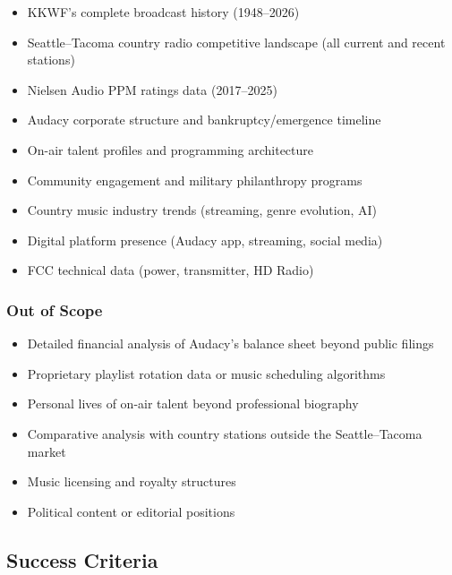 \documentclass[11pt,letterpaper]{article}
\begin{document}
\begin{itemize}[leftmargin=2em]
\item KKWF's complete broadcast history (1948--2026)
\item Seattle--Tacoma country radio competitive landscape (all current and recent stations)
\item Nielsen Audio PPM ratings data (2017--2025)
\item Audacy corporate structure and bankruptcy/emergence timeline
\item On-air talent profiles and programming architecture
\item Community engagement and military philanthropy programs
\item Country music industry trends (streaming, genre evolution, AI)
\item Digital platform presence (Audacy app, streaming, social media)
\item FCC technical data (power, transmitter, HD Radio)
\end{itemize}

\subsubsection*{Out of Scope}

\begin{itemize}[leftmargin=2em]
\item Detailed financial analysis of Audacy's balance sheet beyond public filings
\item Proprietary playlist rotation data or music scheduling algorithms
\item Personal lives of on-air talent beyond professional biography
\item Comparative analysis with country stations outside the Seattle--Tacoma market
\item Music licensing and royalty structures
\item Political content or editorial positions
\end{itemize}

\subsection{Success Criteria}
\end{document}

